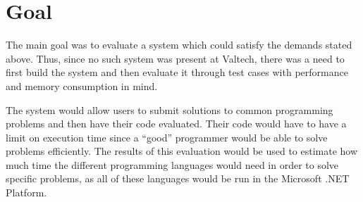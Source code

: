 \section{Goal}
The main goal was to evaluate a system which could satisfy the demands stated above. Thus, since no such system was present at Valtech, there was a need to first build the system and then evaluate it through test cases with performance and memory consumption in mind. 

The system would allow users to submit solutions to common programming problems and then have their code evaluated. Their code would have to have a limit on execution time since a ``good'' programmer would be able to solve problems efficiently. The results of this evaluation would be used to estimate how much time the different programming languages would need in order to solve specific problems, as all of these languages would be run in the Microsoft .NET Platform.